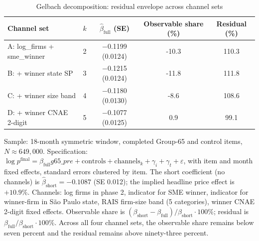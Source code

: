 \begin{table}[!htbp]
\centering
\small
\caption{Gelbach decomposition: residual envelope across channel sets}
\label{tab:v3_gelbach_enriched}
\begin{threeparttable}
\begin{tabular}{lcccc}
\toprule
Channel set & $k$ & $\hat\beta_{\text{full}}$ (SE) & Observable share (\%) & Residual (\%) \\
\midrule
A: log_firms + sme_winner & 2 & $-$0.1199 (0.0124) & -10.3 & 110.3 \\
B: + winner state SP & 3 & $-$0.1215 (0.0124) & -11.8 & 111.8 \\
C: + winner size band & 4 & $-$0.1180 (0.0130) & -8.6 & 108.6 \\
D: + winner CNAE 2-digit & 5 & $-$0.1077 (0.0125) & 0.9 & 99.1 \\
\bottomrule
\end{tabular}
\begin{tablenotes}\footnotesize
\item Sample: 18-month symmetric window, completed Group-65 and
control items, $N \approx 649{,}000$. Specification:
$\log p^{\mathrm{final}} = \beta_{\text{full}} g65\_pre +
\text{controls} + \text{channels}_k + \gamma_i + \gamma_t
+ \varepsilon$, with item and month fixed effects, standard errors
clustered by item. The short coefficient (no channels) is
$\hat\beta_{\text{short}} = -0.1087$ (SE 0.012); the implied
headline price effect is $+10.9\%$. Channels: log firms in phase 2,
indicator for SME winner, indicator for winner-firm in S\~ao
Paulo state, RAIS firm-size band (5 categories), winner CNAE
2-digit fixed effects. Observable share is $(\beta_{\text{short}}-
\beta_{\text{full}})/\beta_{\text{short}} \cdot 100\%$; residual
is $\beta_{\text{full}}/\beta_{\text{short}} \cdot 100\%$. Across
all four channel sets, the observable share remains below seven
percent and the residual remains above ninety-three percent.
\end{tablenotes}
\end{threeparttable}
\end{table}
